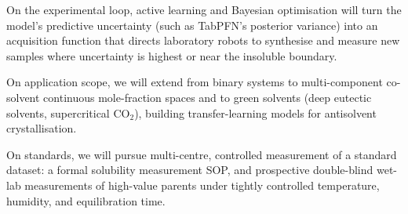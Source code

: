 On the experimental loop, active learning and Bayesian optimisation will turn the model's predictive uncertainty (such as TabPFN's posterior variance) into an acquisition function that directs laboratory robots to synthesise and measure new samples where uncertainty is highest or near the insoluble boundary.

On application scope, we will extend from binary systems to multi-component co-solvent continuous mole-fraction spaces and to green solvents (deep eutectic solvents, supercritical $\mathrm{CO}_2$), building transfer-learning models for antisolvent crystallisation.

On standards, we will pursue multi-centre, controlled measurement of a standard dataset: a formal solubility measurement SOP, and prospective double-blind wet-lab measurements of high-value parents under tightly controlled temperature, humidity, and equilibration time.
